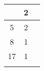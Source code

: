 \begin{table}[H]
\begin{tabularx}{\textwidth}{p{.1em}cc}
\begin{tabular}[t]{cc}
\multicolumn{1}{|c|}{4}                                                        & \multicolumn{1}{c|}{2}                                                             \\ \hline
\multicolumn{1}{|c|}{5}                                                        & \multicolumn{1}{c|}{2}                                                             \\ \hline
\multicolumn{1}{|c|}{8}                                                        & \multicolumn{1}{c|}{1}                                                             \\ \hline
\multicolumn{1}{|c|}{17}                                                        & \multicolumn{1}{c|}{1}                                                             \\ \hline
\end{tabular}

\end{tabularx}\end{table}
